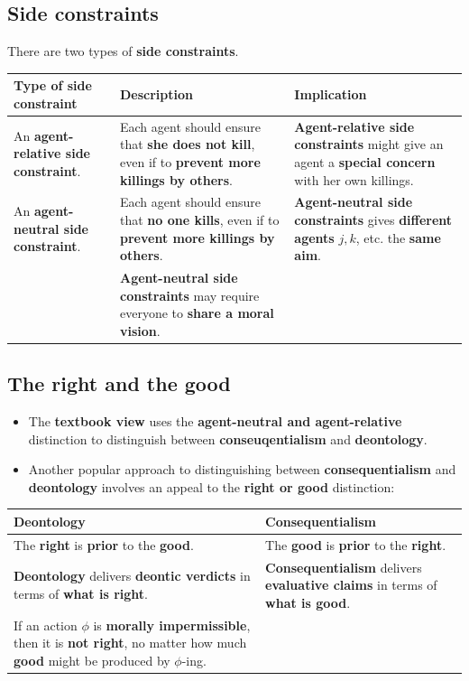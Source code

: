 \documentclass[11pt]{article}
\begin{document}
 \newpage
\subsection{Side constraints}
\label{sec:org9a1af9f}
There are two types of \textbf{side constraints}.
\begin{center}
\begin{tabularx}{\textwidth}{|X|X|X|}
\hline
Type of side constraint & Description & Implication\\
\hline
An \textbf{agent-relative side constraint}. & Each agent should ensure that \textbf{she does not kill}, even if to \textbf{prevent more killings by others}. & \textbf{Agent-relative side constraints} might give an agent a \textbf{special concern} with her own killings.\\
\hline
An \textbf{agent-neutral side constraint}. & Each agent should ensure that \textbf{no one kills}, even if to \textbf{prevent more killings by others}. & \textbf{Agent-neutral side constraints} gives \textbf{different agents} \(j, k\), etc. the \textbf{same aim}.\\
 & \textbf{Agent-neutral side constraints} may require everyone to \textbf{share a moral vision}. & \\
\hline
\end{tabularx}
\end{center}
\subsection{The right and the good}
\label{sec:org1eb58c4}
\begin{itemize}
\item The \textbf{textbook view} uses the \textbf{agent-neutral and agent-relative} distinction to distinguish between \textbf{conseuqentialism} and \textbf{deontology}.
\item Another popular approach to distinguishing between \textbf{consequentialism} and \textbf{deontology} involves an appeal to the \textbf{right or good} distinction:
\end{itemize}
\begin{center}
\begin{tabularx}{\textwidth}{|X|X|}
\hline
Deontology & Consequentialism\\
\hline
The \textbf{right} is \textbf{prior} to the \textbf{good}. & The \textbf{good} is \textbf{prior} to the \textbf{right}.\\
\hline
\textbf{Deontology} delivers \textbf{deontic verdicts} in terms of \textbf{what is right}. & \textbf{Consequentialism} delivers \textbf{evaluative claims} in terms of \textbf{what is good}.\\
If an action \(\phi\) is \textbf{morally impermissible}, then it is \textbf{not right}, no matter how much \textbf{good} might be produced by \(\phi\)-ing. & \\
\hline
\end{tabularx}
\end{center}
\end{document}
